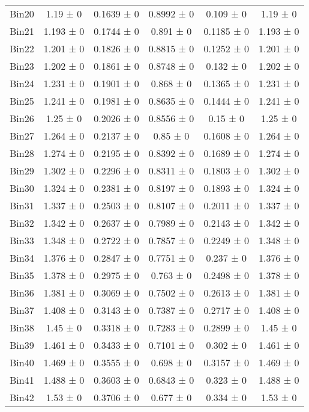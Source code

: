 \begin{tabular}{@{\extracolsep{4pt}}lccccc@{}}
     Bin20 & 1.19 ± 0 & 0.1639 ± 0 & 0.8992 ± 0 & 0.109 ± 0 & 1.19 ± 0 \\ 
     Bin21 & 1.193 ± 0 & 0.1744 ± 0 & 0.891 ± 0 & 0.1185 ± 0 & 1.193 ± 0 \\ 
     Bin22 & 1.201 ± 0 & 0.1826 ± 0 & 0.8815 ± 0 & 0.1252 ± 0 & 1.201 ± 0 \\ 
     Bin23 & 1.202 ± 0 & 0.1861 ± 0 & 0.8748 ± 0 & 0.132 ± 0 & 1.202 ± 0 \\ 
     Bin24 & 1.231 ± 0 & 0.1901 ± 0 & 0.868 ± 0 & 0.1365 ± 0 & 1.231 ± 0 \\ 
     Bin25 & 1.241 ± 0 & 0.1981 ± 0 & 0.8635 ± 0 & 0.1444 ± 0 & 1.241 ± 0 \\ 
     Bin26 & 1.25 ± 0 & 0.2026 ± 0 & 0.8556 ± 0 & 0.15 ± 0 & 1.25 ± 0 \\ 
     Bin27 & 1.264 ± 0 & 0.2137 ± 0 & 0.85 ± 0 & 0.1608 ± 0 & 1.264 ± 0 \\ 
     Bin28 & 1.274 ± 0 & 0.2195 ± 0 & 0.8392 ± 0 & 0.1689 ± 0 & 1.274 ± 0 \\ 
     Bin29 & 1.302 ± 0 & 0.2296 ± 0 & 0.8311 ± 0 & 0.1803 ± 0 & 1.302 ± 0 \\ 
     Bin30 & 1.324 ± 0 & 0.2381 ± 0 & 0.8197 ± 0 & 0.1893 ± 0 & 1.324 ± 0 \\ 
     Bin31 & 1.337 ± 0 & 0.2503 ± 0 & 0.8107 ± 0 & 0.2011 ± 0 & 1.337 ± 0 \\ 
     Bin32 & 1.342 ± 0 & 0.2637 ± 0 & 0.7989 ± 0 & 0.2143 ± 0 & 1.342 ± 0 \\ 
     Bin33 & 1.348 ± 0 & 0.2722 ± 0 & 0.7857 ± 0 & 0.2249 ± 0 & 1.348 ± 0 \\ 
     Bin34 & 1.376 ± 0 & 0.2847 ± 0 & 0.7751 ± 0 & 0.237 ± 0 & 1.376 ± 0 \\ 
     Bin35 & 1.378 ± 0 & 0.2975 ± 0 & 0.763 ± 0 & 0.2498 ± 0 & 1.378 ± 0 \\ 
     Bin36 & 1.381 ± 0 & 0.3069 ± 0 & 0.7502 ± 0 & 0.2613 ± 0 & 1.381 ± 0 \\ 
     Bin37 & 1.408 ± 0 & 0.3143 ± 0 & 0.7387 ± 0 & 0.2717 ± 0 & 1.408 ± 0 \\ 
     Bin38 & 1.45 ± 0 & 0.3318 ± 0 & 0.7283 ± 0 & 0.2899 ± 0 & 1.45 ± 0 \\ 
     Bin39 & 1.461 ± 0 & 0.3433 ± 0 & 0.7101 ± 0 & 0.302 ± 0 & 1.461 ± 0 \\ 
     Bin40 & 1.469 ± 0 & 0.3555 ± 0 & 0.698 ± 0 & 0.3157 ± 0 & 1.469 ± 0 \\ 
     Bin41 & 1.488 ± 0 & 0.3603 ± 0 & 0.6843 ± 0 & 0.323 ± 0 & 1.488 ± 0 \\ 
     Bin42 & 1.53 ± 0 & 0.3706 ± 0 & 0.677 ± 0 & 0.334 ± 0 & 1.53 ± 0 \\ 

\end{tabular}
